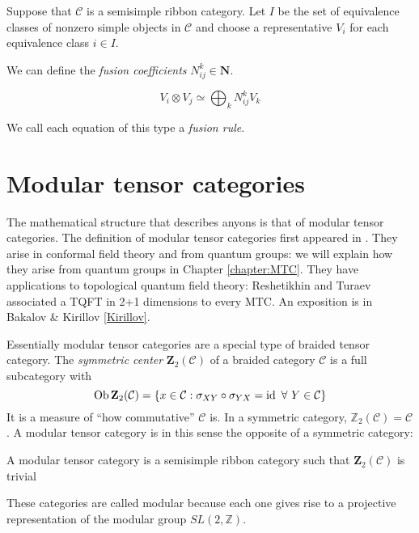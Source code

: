     Suppose that $\mathcal{C}$ is a semisimple ribbon category. Let $I$ be the
    set of equivalence classes of nonzero simple objects in $\mathcal{C}$ and
    choose a representative $V_i$ for each equivalence class  $i \in I$.
    
    We can define the \emph{fusion coefficients} $N_{ij}^k \in \mathbf{N}$.

    \begin{equation}
        V_i \otimes V_j \simeq \bigoplus_k N_{ij}^k V_k
    \end{equation}

    We call each equation of this type a \emph{fusion rule}. 

\section{Modular tensor categories}
\label{section:MTCs}
    The mathematical structure that describes anyons is that of modular tensor
    categories. 
    The definition of modular tensor categories first appeared in \cite{MS}.
    They arise in conformal field theory and from quantum groups: we will
    explain how they arise from quantum groups in Chapter \ref{chapter:MTC}.
    They have applications to topological quantum field theory: Reshetikhin and
    Turaev associated a TQFT in 2+1 dimensions to every MTC. An exposition is
    in Bakalov \& Kirillov \ref{Kirillov}.

    Essentially modular tensor categories are a special type of braided tensor
    category.  The \emph{symmetric center} $\mathbf{Z}_2(\mathcal{C})$ of a
    braided category $\mathcal{C}$ is a full subcategory with 
    \begin{equation}
        \operatorname{Ob} \mathbf{Z}_2(\mathcal{C}) = \left\{ x \in \mathcal{C} : \sigma_{XY} \circ \sigma_{YX} = \operatorname{id}\ \forall\ Y \in \mathcal{C} \right\}
    \end{equation}
    It is a measure of ``how commutative'' $\mathcal{C}$ is. In a symmetric
    category, $\mathbb{Z}_2(\mathcal{C}) = \mathcal{C}$. A modular tensor
    category is in this sense the opposite of a symmetric category:

\begin{defn}
    A modular tensor category is a semisimple ribbon category such that
    $\mathbf{Z}_2(\mathcal{C})$ is trivial
\end{defn}

These categories are called modular because each one gives rise to a projective representation of the modular group $SL(2, \mathbb{Z})$.

